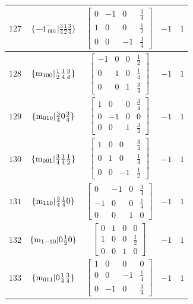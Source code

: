 \documentclass[fleqn,8pt]{jsarticle}
\begin{document}
\begin{longtable}{ccccc}
$ 127 $ & $ \{-4^{-}_{\,\,001}|\frac{3}{4} \frac{1}{2} \frac{3}{4}\} $ & $ \begin{bmatrix} 0 & -1 & 0 & \frac{3}{4} \\ 1 & 0 & 0 & \frac{1}{2} \\ 0 & 0 & -1 & \frac{3}{4} \end{bmatrix} $ & $ -1 $ & $ 1 $ \\ \hline
$ 128 $ & $ \{{\rm m}_{100}|\frac{1}{2} \frac{1}{4} \frac{3}{4}\} $ & $ \begin{bmatrix} -1 & 0 & 0 & \frac{1}{2} \\ 0 & 1 & 0 & \frac{1}{4} \\ 0 & 0 & 1 & \frac{3}{4} \end{bmatrix} $ & $ -1 $ & $ 1 $ \\ \hline
$ 129 $ & $ \{{\rm m}_{010}|\frac{3}{4} 0 \frac{3}{4}\} $ & $ \begin{bmatrix} 1 & 0 & 0 & \frac{3}{4} \\ 0 & -1 & 0 & 0 \\ 0 & 0 & 1 & \frac{3}{4} \end{bmatrix} $ & $ -1 $ & $ 1 $ \\ \hline
$ 130 $ & $ \{{\rm m}_{001}|\frac{3}{4} \frac{1}{4} \frac{1}{2}\} $ & $ \begin{bmatrix} 1 & 0 & 0 & \frac{3}{4} \\ 0 & 1 & 0 & \frac{1}{4} \\ 0 & 0 & -1 & \frac{1}{2} \end{bmatrix} $ & $ -1 $ & $ 1 $ \\ \hline
$ 131 $ & $ \{{\rm m}_{110}|\frac{3}{4} \frac{1}{4} 0\} $ & $ \begin{bmatrix} 0 & -1 & 0 & \frac{3}{4} \\ -1 & 0 & 0 & \frac{1}{4} \\ 0 & 0 & 1 & 0 \end{bmatrix} $ & $ -1 $ & $ 1 $ \\ \hline
$ 132 $ & $ \{{\rm m}_{1-10}|0 \frac{1}{2} 0\} $ & $ \begin{bmatrix} 0 & 1 & 0 & 0 \\ 1 & 0 & 0 & \frac{1}{2} \\ 0 & 0 & 1 & 0 \end{bmatrix} $ & $ -1 $ & $ 1 $ \\ \hline
$ 133 $ & $ \{{\rm m}_{011}|0 \frac{1}{4} \frac{3}{4}\} $ & $ \begin{bmatrix} 1 & 0 & 0 & 0 \\ 0 & 0 & -1 & \frac{1}{4} \\ 0 & -1 & 0 & \frac{3}{4} \end{bmatrix} $ & $ -1 $ & $ 1 $ \\ \hline

\end{longtable}
\end{document}

